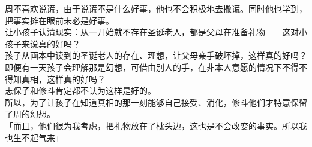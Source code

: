 周不喜欢说谎，由于说谎不是什么好事，他也不会积极地去撒谎。同时他也学到，把事实摊在眼前未必是好事。\\

让小孩子认清现实：从一开始就不存在圣诞老人，都是父母在准备礼物——这对小孩子来说真的好吗？\\

孩子从画本中读到的圣诞老人的存在、理想，让父母亲手破坏掉，这样真的好吗？\\

即便有一天孩子会理解那是幻想，可借由别人的手，在非本人意愿的情况下不得不得知真相，这样真的好吗？\\

志保子和修斗肯定都不认为这样是好的。\\

所以，为了让孩子在知道真相的那一刻能够自己接受、消化，修斗他们才特意保留了周的幻想。\\

「而且，他们很为我考虑，把礼物放在了枕头边，这也是不会改变的事实。所以我也生不起气来」\\

